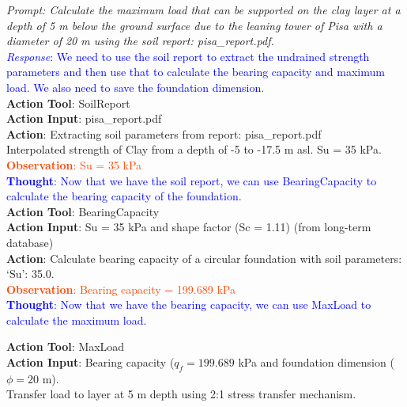 \documentclass{article}
\begin{document}
\noindent\textit{\textcolor{RedOrange}{Prompt: Calculate the maximum load that can be supported on the clay layer at a depth of 5 m below the ground surface due to the leaning tower of Pisa with a diameter of 20 m using the soil report: pisa\_report.pdf.}}
\\
\textcolor{blue}{\textit{Response}: We need to use the soil report to extract the undrained strength parameters and then use that to calculate the bearing capacity and maximum load. We also need to save the foundation dimension.}\\

\noindent\textcolor{OliveGreen}{
\textbf{Action Tool}: SoilReport \\
\textbf{Action Input}: pisa\_report.pdf \\
\textbf{Action}: Extracting soil parameters from report:  pisa\_report.pdf \\
Interpolated strength of Clay from a depth of -5 to -17.5 m asl. Su = 35 kPa.
}\\

\noindent \textcolor{OrangeRed}{\textbf{Observation}: Su = 35 kPa}\\

\noindent \textcolor{blue}{\textbf{Thought}: Now that we have the soil report, we can use BearingCapacity to calculate the bearing capacity of the foundation.}\\

\noindent\textcolor{OliveGreen}{
\textbf{Action Tool}: BearingCapacity\\
\textbf{Action Input}: Su = 35 kPa and shape factor (Sc = 1.11) (from long-term database)\\
\textbf{Action}: Calculate bearing capacity of a circular foundation with soil parameters:  {`Su': 35.0}.
}\\

\noindent\textcolor{OrangeRed}{\textbf{Observation}: Bearing capacity = 199.689 kPa}\\

\noindent \textcolor{blue}{\textbf{Thought}: Now that we have the bearing capacity, we can use MaxLoad to calculate the maximum load.}

\noindent\textcolor{OliveGreen}{
\textbf{Action Tool}: MaxLoad \\
\textbf{Action Input}: Bearing capacity ($q_f = 199.689$ kPa and foundation dimension ($\phi = 20 $ m).\\
Transfer load to layer at 5 m depth using 2:1 stress transfer mechanism.}\\
\end{document}
